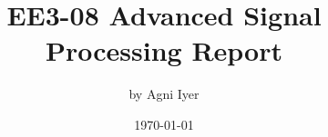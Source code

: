 \documentclass{report}
\title{EE3-08 Advanced Signal Processing Report}
\author{\Large by Agni Iyer}
\date{\today}
\begin{document}
\maketitle
\pagebreak
\pagebreak

% 

% 

% 

% 
\end{document}
